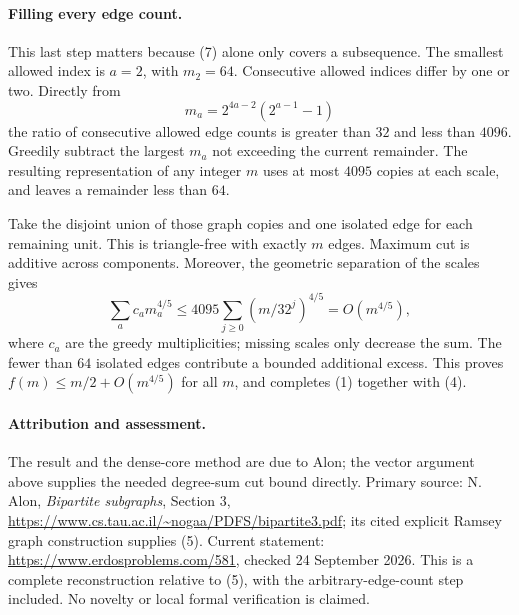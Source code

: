 \paragraph{Filling every edge count.}
This last step matters because (7) alone only covers a subsequence. The smallest allowed index is \(a=2\), with \(m_2=64\). Consecutive allowed indices differ by one or two. Directly from
\[
 m_a=2^{4a-2}(2^{a-1}-1)
\]
the ratio of consecutive allowed edge counts is greater than \(32\) and less than \(4096\). Greedily subtract the largest \(m_a\) not exceeding the current remainder. The resulting representation of any integer \(m\) uses at most \(4095\) copies at each scale, and leaves a remainder less than \(64\).

Take the disjoint union of those graph copies and one isolated edge for each remaining unit. This is triangle-free with exactly \(m\) edges. Maximum cut is additive across components. Moreover, the geometric separation of the scales gives
\[
 \sum_a c_a m_a^{4/5}
 \leq4095\sum_{j\geq0}(m/32^j)^{4/5}=O(m^{4/5}),
\]
where \(c_a\) are the greedy multiplicities; missing scales only decrease the sum. The fewer than \(64\) isolated edges contribute a bounded additional excess. This proves \(f(m)\leq m/2+O(m^{4/5})\) for all \(m\), and completes (1) together with (4).

\paragraph{Attribution and assessment.}
The result and the dense-core method are due to Alon; the vector argument above supplies the needed degree-sum cut bound directly. Primary source: N. Alon, \emph{Bipartite subgraphs}, Section 3, \url{https://www.cs.tau.ac.il/~nogaa/PDFS/bipartite3.pdf}; its cited explicit Ramsey graph construction supplies (5). Current statement: \url{https://www.erdosproblems.com/581}, checked 24 September 2026. This is a complete reconstruction relative to (5), with the arbitrary-edge-count step included. No novelty or local formal verification is claimed.
